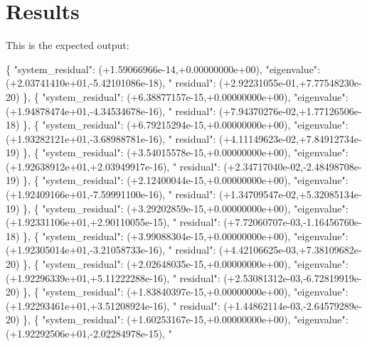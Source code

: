 \section*{Results}

This is the expected output\+:


\begin{DoxyCode}
\{ \textcolor{stringliteral}{"system\_residual"}: (+1.59066966e-14,+0.00000000e+00), \textcolor{stringliteral}{"eigenvalue"}: (+2.03741410e+01,-5.42101086e-18), \textcolor{stringliteral}{"
      residual"}: (+2.92231055e-01,+7.77548230e-20) \},
\{ \textcolor{stringliteral}{"system\_residual"}: (+6.38877157e-15,+0.00000000e+00), \textcolor{stringliteral}{"eigenvalue"}: (+1.94878474e+01,-4.34534678e-16), \textcolor{stringliteral}{"
      residual"}: (+7.94370276e-02,+1.77126506e-18) \},
\{ \textcolor{stringliteral}{"system\_residual"}: (+6.79215294e-15,+0.00000000e+00), \textcolor{stringliteral}{"eigenvalue"}: (+1.93282121e+01,-3.68988781e-16), \textcolor{stringliteral}{"
      residual"}: (+4.11149623e-02,+7.84912734e-19) \},
\{ \textcolor{stringliteral}{"system\_residual"}: (+3.54015578e-15,+0.00000000e+00), \textcolor{stringliteral}{"eigenvalue"}: (+1.92638912e+01,+2.03949917e-16), \textcolor{stringliteral}{"
      residual"}: (+2.34717040e-02,-2.48498708e-19) \},
\{ \textcolor{stringliteral}{"system\_residual"}: (+2.12400044e-15,+0.00000000e+00), \textcolor{stringliteral}{"eigenvalue"}: (+1.92409166e+01,-7.59991100e-16), \textcolor{stringliteral}{"
      residual"}: (+1.34709547e-02,+5.32085134e-19) \},
\{ \textcolor{stringliteral}{"system\_residual"}: (+3.29202859e-15,+0.00000000e+00), \textcolor{stringliteral}{"eigenvalue"}: (+1.92331106e+01,+2.90110055e-15), \textcolor{stringliteral}{"
      residual"}: (+7.72060707e-03,-1.16456760e-18) \},
\{ \textcolor{stringliteral}{"system\_residual"}: (+3.99088304e-15,+0.00000000e+00), \textcolor{stringliteral}{"eigenvalue"}: (+1.92305014e+01,-3.21058733e-16), \textcolor{stringliteral}{"
      residual"}: (+4.42106625e-03,+7.38109682e-20) \},
\{ \textcolor{stringliteral}{"system\_residual"}: (+2.02648035e-15,+0.00000000e+00), \textcolor{stringliteral}{"eigenvalue"}: (+1.92296339e+01,+5.11222288e-16), \textcolor{stringliteral}{"
      residual"}: (+2.53081312e-03,-6.72819919e-20) \},
\{ \textcolor{stringliteral}{"system\_residual"}: (+1.83840397e-15,+0.00000000e+00), \textcolor{stringliteral}{"eigenvalue"}: (+1.92293461e+01,+3.51208924e-16), \textcolor{stringliteral}{"
      residual"}: (+1.44862114e-03,-2.64579289e-20) \},
\{ \textcolor{stringliteral}{"system\_residual"}: (+1.60253167e-15,+0.00000000e+00), \textcolor{stringliteral}{"eigenvalue"}: (+1.92292506e+01,-2.02284978e-15), \textcolor{stringliteral}{"
}
\end{DoxyCode}
